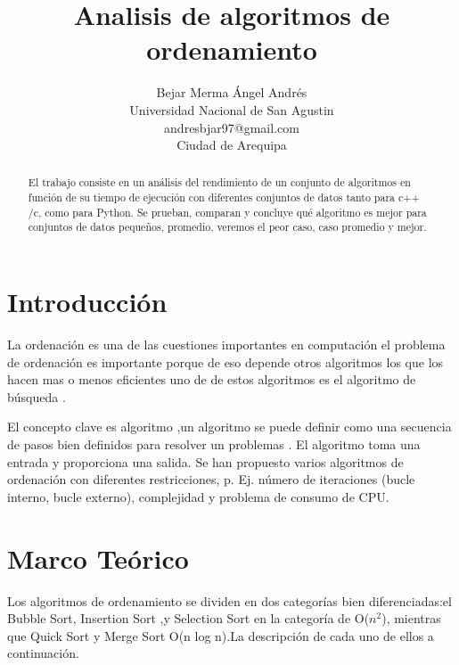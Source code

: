 \documentclass[a4paper]{article}
\title{Analisis de algoritmos de ordenamiento }
\author{Bejar Merma Ángel Andrés\\
  \small Universidad Nacional de San Agustin\\
  \small andresbjar97@gmail.com\\
  \small Ciudad de Arequipa
  \date{}
}
\begin{document}
\maketitle

\begin{abstract}
El trabajo consiste en un análisis del rendimiento de un conjunto de algoritmos en función de su tiempo de ejecución con diferentes conjuntos de datos tanto para c++ /c, como para Python.
Se  prueban, comparan y concluye qué algoritmo es mejor para conjuntos de datos pequeños, promedio, veremos el peor caso, caso promedio y mejor.

\end{abstract}

\section{Introducci\'on}

La ordenación es una de las cuestiones importantes  en computación  el problema de ordenación es importante porque de eso depende otros algoritmos los que los hacen mas o menos eficientes uno de de estos algoritmos es el algoritmo de búsqueda .

El concepto clave  es algoritmo ,un algoritmo se puede definir como una  secuencia de  pasos   bien definidos para resolver un problemas . El algoritmo toma una entrada y proporciona una salida.\cite{5376871}
Se han propuesto varios algoritmos de ordenación con diferentes restricciones, p. Ej. número de iteraciones (bucle interno, bucle externo), complejidad y problema de consumo de CPU.












\section{Marco Teórico}

Los algoritmos de ordenamiento se dividen en dos categorías bien diferenciadas:el Bubble Sort, Insertion Sort ,y Selection Sort en la categoría de O($n^{2}$), mientras que Quick Sort  y Merge Sort  
O(n log n).La descripción de cada uno de ellos a continuación.
\end{document}
